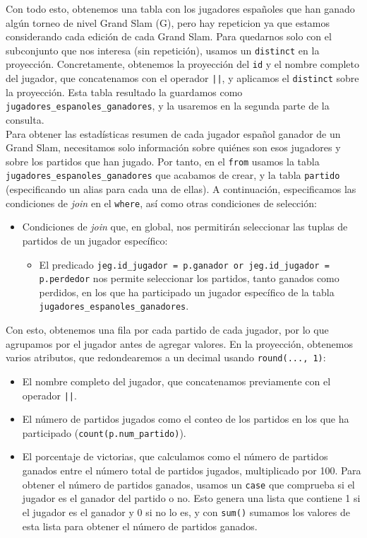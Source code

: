\documentclass[11pt]{opticajnl}
\begin{document}
Con todo esto, obtenemos una tabla con los jugadores españoles que han ganado algún torneo de nivel Grand Slam (G), pero hay repeticion ya que estamos considerando cada edición de cada Grand Slam. Para quedarnos solo con el subconjunto que nos interesa (sin repetición), usamos un \texttt{distinct} en la proyección. Concretamente, obtenemos la proyección del \texttt{id} y el nombre completo del jugador, que concatenamos con el operador \texttt{||}, y aplicamos el \texttt{distinct} sobre la proyección. Esta tabla resultado la guardamos como \texttt{jugadores\_espanoles\_ganadores}, y la usaremos en la segunda parte de la consulta. \\

Para obtener las estadísticas resumen de cada jugador español ganador de un Grand Slam, necesitamos solo información sobre quiénes son esos jugadores y sobre los partidos que han jugado. Por tanto, en el \texttt{from} usamos la tabla \texttt{jugadores\_espanoles\_ganadores} que acabamos de crear, y la tabla \texttt{partido} (especificando un alias para cada una de ellas). A continuación, especificamos las condiciones de \textit{join} en el \texttt{where}, así como otras condiciones de selección:
\begin{itemize}
\item Condiciones de \textit{join} que, en global, nos permitirán seleccionar las tuplas de partidos de un jugador específico:
\begin{itemize}
\item El predicado \texttt{jeg.id_jugador = p.ganador or jeg.id_jugador = p.perdedor} nos permite seleccionar los partidos, tanto ganados como perdidos, en los que ha participado un jugador específico de la tabla \texttt{jugadores\_espanoles\_ganadores}.
\end{itemize}
\end{itemize}

Con esto, obtenemos una fila por cada partido de cada jugador, por lo que agrupamos por el jugador antes de agregar valores. En la proyección, obtenemos varios atributos, que redondearemos a un decimal usando \texttt{round(..., 1)}:
\begin{itemize}
\item El nombre completo del jugador, que concatenamos previamente con el operador \texttt{||}.
\item El número de partidos jugados como el conteo de los partidos en los que ha participado (\texttt{count(p.num\_partido)}).
\item El porcentaje de victorias, que calculamos como el número de partidos ganados entre el número total de partidos jugados, multiplicado por 100. Para obtener el número de partidos ganados, usamos un \texttt{case} que comprueba si el jugador es el ganador del partido o no. Esto genera una lista que contiene 1 si el jugador es el ganador y 0 si no lo es, y con \texttt{sum()} sumamos los valores de esta lista para obtener el número de partidos ganados. 
\end{itemize}
\end{document}
